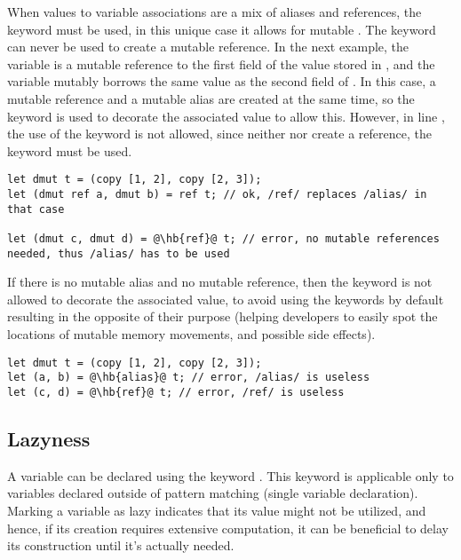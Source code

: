 When values to variable associations are a mix of aliases and references, the
keyword  must be used, in this unique case it allows for mutable
. The  keyword can never be used to create a mutable
reference. In the next example, the variable  is a mutable reference
to the first field of the value stored in , and the variable
 mutably borrows the same value as the second field of . In
this case, a mutable reference and a mutable alias are created at the same time,
so the keyword  is used to decorate the associated value to allow
this. However, in line , the use of the keyword  is not
allowed, since neither  nor  create a reference, the keyword
 must be used.

\begin{lstlisting}[style=coloredverbatim, escapechar=@]
let dmut t = (copy [1, 2], copy [2, 3]);
let (dmut ref a, dmut b) = ref t; // ok, /ref/ replaces /alias/ in that case

let (dmut c, dmut d) = @\hb{ref}@ t; // error, no mutable references needed, thus /alias/ has to be used
\end{lstlisting}

If there is no mutable alias and no mutable reference, then the keyword is not
allowed to decorate the associated value, to avoid using the keywords by default
resulting in the opposite of their purpose (helping developers to easily spot
the locations of mutable memory movements, and possible side effects).

\begin{lstlisting}[style=coloredverbatim, escapechar=@]
let dmut t = (copy [1, 2], copy [2, 3]);
let (a, b) = @\hb{alias}@ t; // error, /alias/ is useless
let (c, d) = @\hb{ref}@ t; // error, /ref/ is useless
\end{lstlisting}

\subsection{Lazyness}
\label{sec:lazyness}

A variable can be declared using the keyword . This keyword is
applicable only to variables declared outside of pattern matching (single
variable declaration). Marking a variable as lazy indicates that its value might
not be utilized, and hence, if its creation requires extensive computation, it
can be beneficial to delay its construction until it's actually needed.

